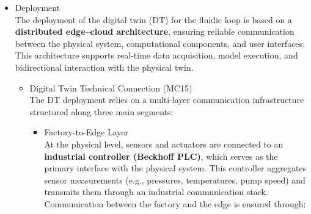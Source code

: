 \documentclass[
]{article}
\providecommand{\tightlist}{%
  \setlength{\itemsep}{0pt}\setlength{\parskip}{0pt}}
\begin{document}
\begin{itemize}
\begin{itemize}
\begin{itemize}
\begin{itemize}
\begin{itemize}
          \begin{itemize}
          \tightlist
          \item
            validation of updated parameters against observed data,
          \item
            monitoring divergence between DT and physical twin,
          \end{itemize}
        \end{itemize}

        Overall, fidelity is not static but emerges from the
        \textbf{continuous interaction between physics-based models,
        data-driven models, and real-world observations}. The
        interaction between these models illustrates a hybrid
        architecture, where physics-based simulation is augmented by
        data-driven inference mechanisms.
      \end{itemize}
    \item
      Deployment\\
      The deployment of the digital twin (DT) for the fluidic loop is
      based on a \textbf{distributed edge--cloud architecture}, ensuring
      reliable communication between the physical system, computational
      components, and user interfaces. This architecture supports
      real-time data acquisition, model execution, and bidirectional
      interaction with the physical twin.

      \begin{itemize}
      \item
        Digital Twin Technical Connection (MC15)\\
        The DT deployment relies on a multi-layer communication
        infrastructure structured along three main segments:

        \begin{itemize}
        \tightlist
        \item
          Factory-to-Edge Layer\\
          At the physical level, sensors and actuators are connected to
          an \textbf{industrial controller (Beckhoff PLC)}, which serves
          as the primary interface with the physical system. This
          controller aggregates sensor measurements (e.g., pressures,
          temperatures, pump speed) and transmits them through an
          industrial communication stack.\\
          Communication between the factory and the edge is ensured
          through:


\end{itemize}
\end{itemize}
\end{itemize}
\end{itemize}
\end{itemize}
\end{document}
